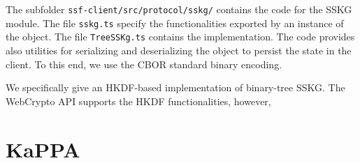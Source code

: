 The subfolder \texttt{ssf-client/src/protocol/sskg/} contains the code for the SSKG module.
The file \texttt{sskg.ts} specify the functionalities exported by an instance of the object.
The file \texttt{TreeSSKg.ts} contains the implementation.
The code provides also utilities for serializing and deserializing the object to persist the state in the client.
To this end, we use the CBOR standard binary encoding.

We specifically give an HKDF-based implementation of binary-tree SSKG.
The WebCrypto API supports the HKDF functionalities, however,





\section{KaPPA}

